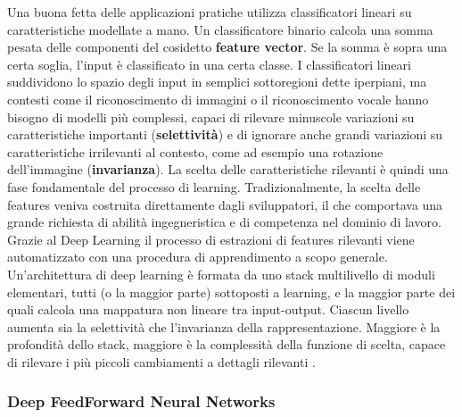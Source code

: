 Una buona fetta delle applicazioni pratiche utilizza classificatori lineari su caratteristiche modellate a mano. 
Un classificatore binario calcola una somma pesata delle componenti del cosidetto \textbf{feature vector}. Se la somma è sopra una certa soglia, 
l'input è classificato in una certa classe. I classificatori lineari suddividono lo spazio degli input in semplici sottoregioni dette iperpiani, ma contesti come il riconoscimento di immagini o il riconoscimento vocale hanno
bisogno di modelli più complessi, capaci di rilevare  minuscole variazioni su caratteristiche importanti (\textbf{selettività}) e di ignorare anche grandi variazioni su caratteristiche irrilevanti al contesto, come ad esempio una rotazione dell'immagine (\textbf{invarianza}). La scelta delle caratteristiche rilevanti è quindi una
fase fondamentale del processo di learning. Tradizionalmente, la scelta delle features veniva costruita direttamente dagli sviluppatori, il che comportava una grande richiesta di abilità ingegneristica e di competenza nel dominio di lavoro.
Grazie al Deep  Learning  il processo di estrazioni di features rilevanti viene automatizzato con una procedura di apprendimento a scopo generale.
Un'architettura di deep learning è formata da uno stack multilivello di moduli elementari, tutti (o la maggior parte) sottoposti a learning, e la maggior parte dei quali
calcola una mappatura non lineare tra input-output. Ciascun livello aumenta sia la selettività che l'invarianza della rappresentazione. 
Maggiore è la profondità dello stack, maggiore è la complessità della funzione di scelta, capace di rilevare i più piccoli cambiamenti a dettagli rilevanti \cite{deep}.

\subsubsection{Deep FeedForward Neural Networks}

